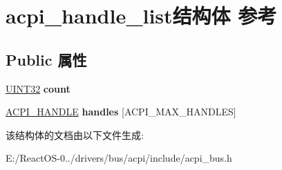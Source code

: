 \hypertarget{structacpi__handle__list}{}\section{acpi\+\_\+handle\+\_\+list结构体 参考}
\label{structacpi__handle__list}
\subsection*{Public 属性}
\begin{DoxyCompactItemize}
\item 
\mbox{\label{structacpi__handle__list_a6c9bb927a31342aeccac7b7efab4a345}} 
\hyperlink{_processor_bind_8h_ae1e6edbbc26d6fbc71a90190d0266018}{U\+I\+N\+T32} {\bfseries count}
\item 
\mbox{\label{structacpi__handle__list_afa7f22c17ceb9e1d91aea3dcc2bf2674}} 
\hyperlink{interfacevoid}{A\+C\+P\+I\+\_\+\+H\+A\+N\+D\+LE} {\bfseries handles} \mbox{[}A\+C\+P\+I\+\_\+\+M\+A\+X\+\_\+\+H\+A\+N\+D\+L\+ES\mbox{]}
\end{DoxyCompactItemize}


该结构体的文档由以下文件生成\+:\begin{DoxyCompactItemize}
\item 
E\+:/\+React\+O\+S-\/0../drivers/bus/acpi/include/acpi\+\_\+bus.\+h\end{DoxyCompactItemize}
